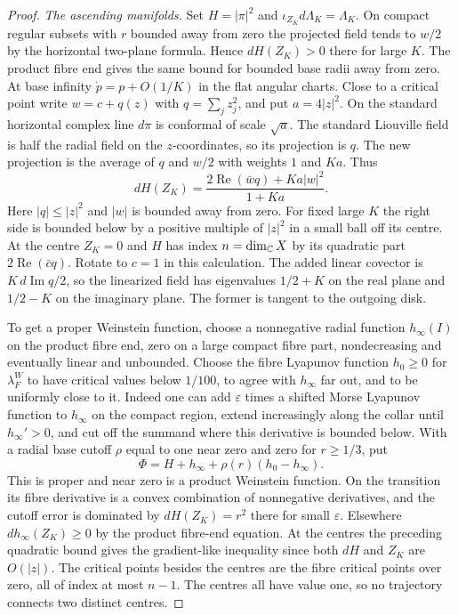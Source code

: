 \begin{proof}
\medskip
\noindent\emph{The ascending manifolds.}
Set $H=|\pi|^2$ and $\iota_{Z_K}d\Lambda_K=\Lambda_K$. On compact regular subsets with $r$ bounded away from zero the projected field tends to $w/2$ by the horizontal two-plane formula. Hence $dH(Z_K)>0$ there for large $K$. The product fibre end gives the same bound for bounded base radii away from zero. At base infinity $\dot p=p+O(1/K)$ in the flat angular charts. Close to a critical point write $w=c+q(z)$ with $q=\sum_j z_j^2$, and put $a=4|z|^2$. On the standard horizontal complex line $d\pi$ is conformal of scale $\sqrt a$. The standard Liouville field is half the radial field on the $z$-coordinates, so its projection is $q$. The new projection is the average of $q$ and $w/2$ with weights $1$ and $Ka$. Thus
\[
                  dH(Z_K)=
           \frac{2\operatorname{Re}(\bar w q)+Ka|w|^2}{1+Ka}.
\]
Here $|q|\le|z|^2$ and $|w|$ is bounded away from zero. For fixed large $K$ the right side is bounded below by a positive multiple of $|z|^2$ in a small ball off its centre. At the centre $Z_K=0$ and $H$ has index $n=\dim_\mathbb C X$ by its quadratic part $2\operatorname{Re}(\bar c q)$. Rotate to $c=1$ in this calculation. The added linear covector is $K\,d\operatorname{Im}q/2$, so the linearized field has eigenvalues $1/2+K$ on the real plane and $1/2-K$ on the imaginary plane. The former is tangent to the outgoing disk.

To get a proper Weinstein function, choose a nonnegative radial function $h_\infty(I)$ on the product fibre end, zero on a large compact fibre part, nondecreasing and eventually linear and unbounded. Choose the fibre Lyapunov function $h_0\ge0$ for $\lambda_F^W$ to have critical values below $1/100$, to agree with $h_\infty$ far out, and to be uniformly close to it. Indeed one can add $\varepsilon$ times a shifted Morse Lyapunov function to $h_\infty$ on the compact region, extend increasingly along the collar until $h_\infty'>0$, and cut off the summand where this derivative is bounded below. With a radial base cutoff $\rho$ equal to one near zero and zero for $r\ge1/3$, put
\[
                         \Phi=H+h_\infty+\rho(r)(h_0-h_\infty).
\]
This is proper and near zero is a product Weinstein function. On the transition its fibre derivative is a convex combination of nonnegative derivatives, and the cutoff error is dominated by $dH(Z_K)=r^2$ there for small $\varepsilon$. Elsewhere $dh_\infty(Z_K)\ge0$ by the product fibre-end equation. At the centres the preceding quadratic bound gives the gradient-like inequality since both $dH$ and $Z_K$ are $O(|z|)$. The critical points besides the centres are the fibre critical points over zero, all of index at most $n-1$. The centres all have value one, so no trajectory connects two distinct centres.


\end{proof}
